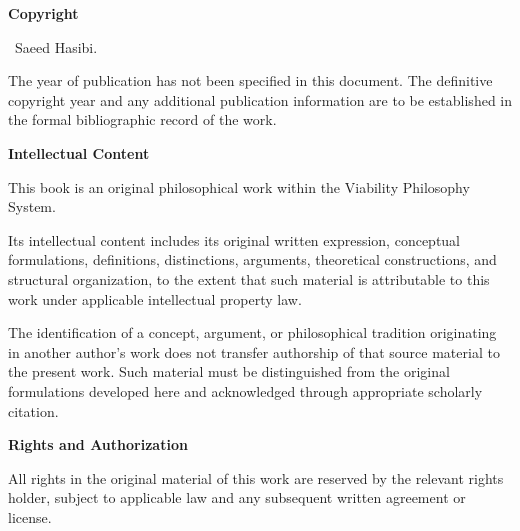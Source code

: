 \noindent
\textbf{Copyright}

\vspace{0.3cm}

\noindent
\textcopyright\ Saeed Hasibi.

\vspace{0.4cm}

\noindent
The year of publication has not been specified in this document.
The definitive copyright year and any additional publication
information are to be established in the formal bibliographic
record of the work.


\vspace{0.9cm}



\noindent
\textbf{Intellectual Content}

\vspace{0.3cm}

\noindent
This book is an original philosophical work within the
Viability Philosophy System.

Its intellectual content includes its original written expression,
conceptual formulations, definitions, distinctions, arguments,
theoretical constructions, and structural organization, to the
extent that such material is attributable to this work under
applicable intellectual property law.

The identification of a concept, argument, or philosophical
tradition originating in another author's work does not transfer
authorship of that source material to the present work. Such
material must be distinguished from the original formulations
developed here and acknowledged through appropriate scholarly
citation.


\vspace{0.9cm}



\noindent
\textbf{Rights and Authorization}

\vspace{0.3cm}

\noindent
All rights in the original material of this work are reserved
by the relevant rights holder, subject to applicable law and
any subsequent written agreement or license.

